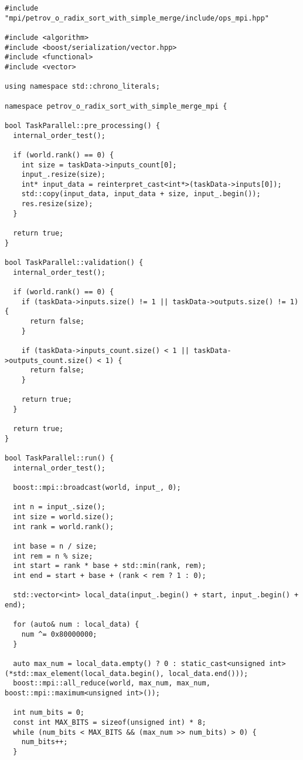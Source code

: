 \documentclass[12pt]{article}
\begin{document}
\begin{lstlisting}[caption={Файл реализации параллельной версии поразрядной сортировки}]
#include "mpi/petrov_o_radix_sort_with_simple_merge/include/ops_mpi.hpp"

#include <algorithm>
#include <boost/serialization/vector.hpp>
#include <functional>
#include <vector>

using namespace std::chrono_literals;

namespace petrov_o_radix_sort_with_simple_merge_mpi {

bool TaskParallel::pre_processing() {
  internal_order_test();

  if (world.rank() == 0) {
    int size = taskData->inputs_count[0];
    input_.resize(size);
    int* input_data = reinterpret_cast<int*>(taskData->inputs[0]);
    std::copy(input_data, input_data + size, input_.begin());
    res.resize(size);
  }

  return true;
}

bool TaskParallel::validation() {
  internal_order_test();

  if (world.rank() == 0) {
    if (taskData->inputs.size() != 1 || taskData->outputs.size() != 1) {
      return false;
    }

    if (taskData->inputs_count.size() < 1 || taskData->outputs_count.size() < 1) {
      return false;
    }

    return true;
  }

  return true;
}

bool TaskParallel::run() {
  internal_order_test();

  boost::mpi::broadcast(world, input_, 0);

  int n = input_.size();
  int size = world.size();
  int rank = world.rank();

  int base = n / size;
  int rem = n % size;
  int start = rank * base + std::min(rank, rem);
  int end = start + base + (rank < rem ? 1 : 0);

  std::vector<int> local_data(input_.begin() + start, input_.begin() + end);

  for (auto& num : local_data) {
    num ^= 0x80000000;
  }

  auto max_num = local_data.empty() ? 0 : static_cast<unsigned int>(*std::max_element(local_data.begin(), local_data.end()));
  boost::mpi::all_reduce(world, max_num, max_num, boost::mpi::maximum<unsigned int>());

  int num_bits = 0;
  const int MAX_BITS = sizeof(unsigned int) * 8;
  while (num_bits < MAX_BITS && (max_num >> num_bits) > 0) {
    num_bits++;
  }


\end{lstlisting}
\end{document}
